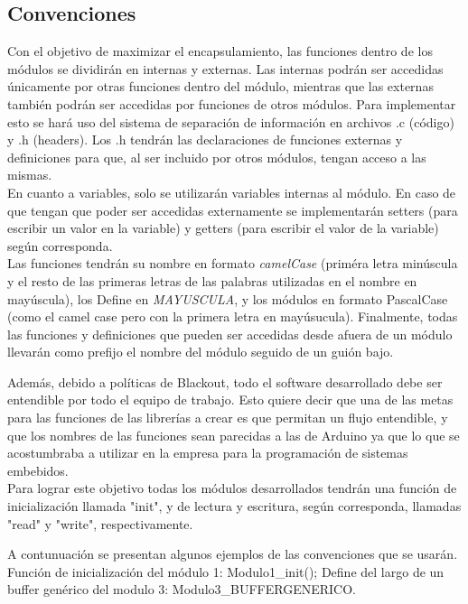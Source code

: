 \subsection{Convenciones}
Con el objetivo de maximizar el encapsulamiento, las funciones dentro de los módulos se dividirán en internas y externas. Las internas podrán ser accedidas únicamente por otras funciones dentro del módulo, mientras que las externas también podrán ser accedidas por funciones de otros módulos. Para implementar esto se hará uso del sistema de separación de información en archivos .c (código) y .h (headers). Los .h tendrán las declaraciones de funciones externas y definiciones para que, al ser incluido por otros módulos, tengan acceso a las mismas.\\
En cuanto a variables, solo se utilizarán variables internas al módulo. En caso de que tengan que poder ser accedidas externamente se implementarán setters (para escribir un valor en la variable) y getters (para escribir el valor de la variable) según corresponda.\\
Las funciones tendrán su nombre en formato \textit{camelCase} (priméra letra minúscula y el resto de las primeras letras de las palabras utilizadas en el nombre en mayúscula), los Define en \textit{MAYUSCULA}, y los módulos en formato PascalCase (como el camel case pero con la primera letra en mayúsucula).
Finalmente, todas las funciones y definiciones que pueden ser accedidas desde afuera de un módulo llevarán como prefijo el nombre del módulo seguido de un guión bajo. 

Además, debido a políticas de Blackout, todo el software desarrollado debe ser entendible por todo el equipo de trabajo. Esto quiere decir que una de las metas para las funciones de las librerías a crear es que permitan un flujo entendible, y que los nombres de las funciones sean parecidas a las de Arduino ya que lo que se acostumbraba a utilizar en la empresa para la programación de sistemas embebidos.\\
Para lograr este objetivo todas los módulos desarrollados tendrán una función de inicialización llamada "init", y de lectura y escritura, según corresponda, llamadas "read" y "write", respectivamente. 

A contunuación se presentan algunos ejemplos de las convenciones que se usarán. Función de inicialización del módulo 1: Modulo1\_init(); Define del largo de un buffer genérico del modulo 3: Modulo3\_BUFFERGENERICO.


